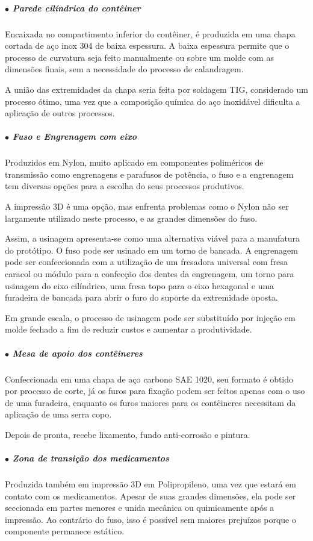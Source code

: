 \subparagraph*{$\bullet$ Parede cilíndrica do contêiner} \hfill

Encaixada no compartimento inferior do contêiner, é produzida em uma chapa cortada de aço inox 304 de baixa espessura. A baixa espessura permite que o processo de curvatura seja feito manualmente ou sobre um molde com as dimensões finais, sem a necessidade do processo de calandragem.

A união das extremidades da chapa seria feita por soldagem TIG, considerado um processo ótimo, uma vez que a composição química do aço inoxidável dificulta a aplicação de outros processos.

\subparagraph*{$\bullet$ Fuso e Engrenagem com eixo} \hfill

Produzidos em Nylon, muito aplicado em componentes poliméricos de transmissão como engrenagens e parafusos de potência, o fuso e a engrenagem tem diversas opções para a escolha do seus processos produtivos.

A impressão 3D é uma opção, mas enfrenta problemas como o Nylon não ser largamente utilizado neste processo, e as grandes dimensões do fuso.

Assim, a usinagem apresenta-se como uma alternativa viável para a manufatura do protótipo. O fuso pode ser usinado em um torno de bancada. A engrenagem pode ser confeccionada com a utilização de um fresadora universal com fresa caracol ou módulo para a confecção dos dentes da engrenagem, um torno para usinagem do eixo cilíndrico, uma fresa topo para o eixo hexagonal e uma furadeira de bancada para abrir o furo do suporte da extremidade oposta.

Em grande escala, o processo de usinagem pode ser substituído por injeção em molde fechado a fim de reduzir custos e aumentar a produtividade.

\subparagraph*{$\bullet$ Mesa de apoio dos contêineres} \hfill

Confeccionada em uma chapa de aço carbono SAE 1020, seu formato é obtido por processo de corte, já os furos para fixação podem ser feitos apenas com o uso de uma furadeira, enquanto os furos maiores para os contêineres necessitam da aplicação de uma serra copo.

Depois de pronta, recebe lixamento, fundo anti-corrosão e pintura.

\subparagraph*{$\bullet$ Zona de transição dos medicamentos} \hfill 

Produzida também em impressão 3D em Polipropileno, uma vez que estará em contato com os medicamentos. Apesar de suas grandes dimensões, ela pode ser seccionada em partes menores e unida mecânica ou quimicamente após a impressão. Ao contrário do fuso, isso é possível sem maiores prejuízos porque o componente permanece estático.


